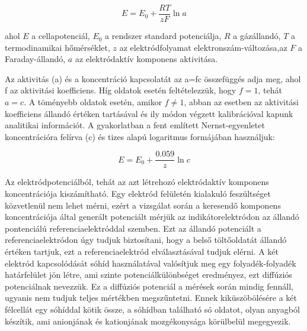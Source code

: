 \begin{equation}
E = E_\text{0} + \frac{RT}{zF} \ln a
\end{equation}

ahol $E$ a cellapotenciál, $E_\text{0}$ a rendszer standard potenciálja, $R$ a gázállandó, $T$ a termodinamikai hőmérséklet, $z$ az elektródfolyamat elektronszám-változása,az $F$ a Faraday-állandó, $a$ az elektródaktív komponens aktivitása.

Az aktivitás (a) és a koncentráció kapcsolatát az a=fc összefüggés adja meg, ahol f az aktivitási koefficiens. Híg oldatok esetén feltételezzük, hogy $f=1$, tehát $a=c$. A töményebb oldatok esetén, amikor $f\neq 1$, abban az esetben az aktivitási koefficiens állandó értéken tartásával és ily módon végzett kalibrációval kapunk analitikai információt. A gyakorlatban a fent említett Nernst-egyenletet koncentrációra felírva (c) és tizes alapú logaritmus formájában használjuk:

\begin{equation}
E= E_\text{0} + \frac{0.059}{z} \ln c
\end{equation}

Az elektródpotenciálból, tehát az azt létrehozó elektródaktív komponens koncentrációja kiszámítható. Egy elektród felületén kialakuló feszültséget közvetlenül nem lehet mérni, ezért a vizsgálat során a keresendő komponens koncentrációja által generált potenciált mérjük az indikátorelektródon az állandó pontenciálú referenciaelektróddal szemben. Ezt az állandó potenciált a referenciaelektródon úgy tudjuk biztosítani, hogy a belső töltőoldatát állandó értéken tartjuk, ezt a referenciaelektród elválasztásával tudjuk elérni. A két elektród kapcsolódását sóhíd használatával valósítjuk meg egy folyadék-folyadék határfelület jön létre, ami szinte potenciálkülönbséget eredményez, ezt diffúziós potenciálnak nevezzük. Ez a diffúziós potenciál a mérések során mindig fennáll, ugyanis nem tudjuk teljes mértékben megszűntetni. Ennek kiküszöbölésére a két félcellát egy sóhíddal kötik össze, a sóhídban található só oldatot, olyan anyagból készítik, ami anionjának és kationjának mozgékonysága körülbelül megegyezik.


